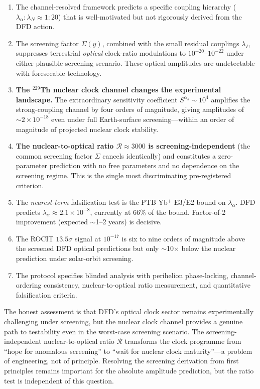 \documentclass[twocolumn,showpacs,preprintnumbers,amsmath,amssymb,prd]{revtex4-2}
\begin{document}
\begin{enumerate}
\item The channel-resolved framework predicts a specific coupling
  hierarchy ($\lambda_\alpha : \lambda_N \approx 1:20$) that is
  well-motivated but not rigorously derived from the DFD action.

\item The screening factor $\Sigma(y)$, combined with the small
  residual couplings $\lambda_I$, suppresses terrestrial
  \emph{optical} clock-ratio modulations to $10^{-20}$--$10^{-22}$
  under either plausible screening scenario.  These optical
  amplitudes are undetectable with foreseeable technology.

\item \textbf{The $^{229}$Th nuclear clock channel changes the
  experimental landscape.}  The extraordinary sensitivity
  coefficient $S^{\alpha_s} \sim 10^4$ amplifies the strong-coupling
  channel by four orders of magnitude, giving amplitudes of
  $\sim 2 \times 10^{-18}$ even under full Earth-surface
  screening---within an order of magnitude of projected nuclear
  clock stability.

\item \textbf{The nuclear-to-optical ratio $\mathcal{R} \approx 3000$
  is screening-independent} (the common screening factor $\Sigma$
  cancels identically) and constitutes a zero-parameter prediction
  with no free parameters and no dependence on the screening regime.
  This is the single most discriminating pre-registered criterion.

\item The \emph{nearest-term} falsification test is the PTB
  Yb$^+$ E3/E2 bound on $\lambda_\alpha$.  DFD predicts
  $\lambda_\alpha \approx 2.1 \times 10^{-8}$, currently at 66\%
  of the bound.  Factor-of-2 improvement (expected $\sim$1--2
  years) is decisive.

\item The ROCIT $13.5\sigma$ signal at $10^{-17}$ is six to nine
  orders of magnitude above the screened DFD optical predictions
  but only $\sim$10$\times$ below the nuclear prediction under
  solar-orbit screening.

\item The protocol specifies blinded analysis with perihelion
  phase-locking, channel-ordering consistency, nuclear-to-optical
  ratio measurement, and quantitative falsification criteria.
\end{enumerate}

The honest assessment is that DFD's optical clock sector remains
experimentally challenging under screening, but the nuclear clock
channel provides a genuine path to testability even in the
worst-case screening scenario.  The screening-independent
nuclear-to-optical ratio $\mathcal{R}$ transforms the clock
programme from ``hope for anomalous screening'' to ``wait for
nuclear clock maturity''---a problem of engineering, not of
principle.  Resolving the screening derivation from first
principles remains important for the absolute amplitude prediction,
but the ratio test is independent of this question.
\end{document}
